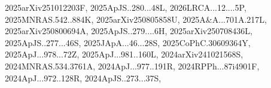 \documentclass[12pt]{article}
\begin{document}
{2025arXiv251012203F,%
2025ApJS..280...48L,%
2026LRCA...12....5P,%
2025MNRAS.542..884K,%
2025arXiv250805858U,%
2025A&A...701A.217L,%
2025arXiv250800694A,%
2025ApJS..279....6H,%
2025arXiv250708436L,%
2025ApJS..277...46S,%
2025JApA...46...28S,%
2025CoPhC.30609364Y,%
2025ApJ...978...72Z,%
2025ApJ...981..160L,%
2024arXiv241021568S,%
2024MNRAS.534.3761A,%
2024ApJ...977..191R,%
2024RPPh...87i4901F,%
2024ApJ...972..128R,%
2024ApJS..273...37S,%
}
\end{document}
